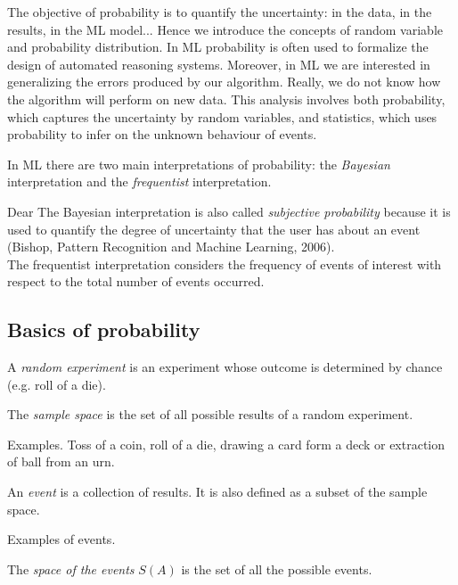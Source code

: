 The objective of probability is to quantify the uncertainty: in the data, in the results, in the ML model...
Hence we introduce the concepts of random variable and probability distribution.
In ML probability is often used to formalize the design of automated reasoning systems.
Moreover, in ML we are interested in generalizing the errors produced by our algorithm. Really, we do not know how the algorithm will perform on new data. This analysis involves both probability, which captures the uncertainty by random variables, and statistics, which uses probability to infer on the unknown behaviour of events.

In ML there are two main interpretations of probability: the \textit{Bayesian} interpretation and the \textit{frequentist} interpretation.

Dear The Bayesian interpretation is also called \textit{subjective probability} because it is used to quantify the degree of uncertainty that the user has about an event (Bishop, Pattern Recognition and Machine Learning, 2006).\\
The frequentist interpretation considers the frequency of events of interest with respect to the total number of events occurred.

\subsection{Basics of probability}

\begin{definition}
    A \textit{random experiment} is an experiment whose outcome is determined by chance (e.g. roll of a die).
\end{definition}

\begin{definition}
    The \textit{sample space} is the set of all possible results of a random experiment.
\end{definition}

Examples. Toss of a coin, roll of a die, drawing a card form a deck  or extraction of ball from an urn.

\begin{definition}
    An \textit{event} is a collection of results. It is also defined as a subset of the sample space.
\end{definition}

Examples of events.

\begin{definition}
    The \textit{space of the events} $S(A)$ is the set of all the possible events.
\end{definition}


